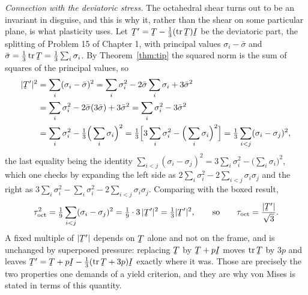 \begin{solution}
\medskip
\noindent\emph{Connection with the deviatoric stress.}
The octahedral shear turns out to be an invariant in disguise, and this
is why it, rather than the shear on some particular plane, is what
plasticity uses. Let $\bT'=\bT-\tfrac13(\tr\bT)\I$ be the deviatoric
part, the splitting of Problem 15 of Chapter 1, with principal values
$\sigma_{i}-\bar\sigma$ and $\bar\sigma=\tfrac13\tr\bT
=\tfrac13\sum_{i}\sigma_{i}$. By Theorem~\ref{thm:tip} the squared norm
is the sum of squares of the principal values, so
\[
\begin{aligned}
   |\bT'|^{2}&=\sum_{i}(\sigma_{i}-\bar\sigma)^{2}
   =\sum_{i}\sigma_{i}^{2}-2\bar\sigma\sum_{i}\sigma_{i}
     +3\bar\sigma^{2}\\
   &=\sum_{i}\sigma_{i}^{2}-2\bar\sigma(3\bar\sigma)+3\bar\sigma^{2}
   =\sum_{i}\sigma_{i}^{2}-3\bar\sigma^{2}\\
   &=\sum_{i}\sigma_{i}^{2}
     -\tfrac13\Big(\sum_{i}\sigma_{i}\Big)^{2}
   =\tfrac13\Big[3\sum_{i}\sigma_{i}^{2}
     -\Big(\sum_{i}\sigma_{i}\Big)^{2}\Big]
   =\tfrac13\sum_{i<j}(\sigma_{i}-\sigma_{j})^{2},
\end{aligned}
\]
the last equality being the identity
$\sum_{i<j}(\sigma_{i}-\sigma_{j})^{2}
=3\sum_{i}\sigma_{i}^{2}-\big(\sum_{i}\sigma_{i}\big)^{2}$, which one
checks by expanding the left side as
$2\sum_{i}\sigma_{i}^{2}-2\sum_{i<j}\sigma_{i}\sigma_{j}$ and the right
as $3\sum_{i}\sigma_{i}^{2}-\sum_{i}\sigma_{i}^{2}
-2\sum_{i<j}\sigma_{i}\sigma_{j}$. Comparing with the boxed result,
\[
   \tau_{\text{oct}}^{2}=\tfrac19\sum_{i<j}(\sigma_{i}-\sigma_{j})^{2}
   =\tfrac19\cdot3\,|\bT'|^{2}=\tfrac13|\bT'|^{2},
   \qquad\text{so}\qquad
   \tau_{\text{oct}}=\frac{|\bT'|}{\sqrt3} .
\]
A fixed multiple of $|\bT'|$ depends on $\bT$ alone and not on the
frame, and is unchanged by superposed pressure: replacing $\bT$ by
$\bT+p\I$ moves $\tr\bT$ by $3p$ and leaves
$\bT'=\bT+p\I-\tfrac13(\tr\bT+3p)\I$ exactly where it was. Those are
precisely the two properties one demands of a yield criterion, and they
are why von Mises is stated in terms of this quantity.
\end{solution}

